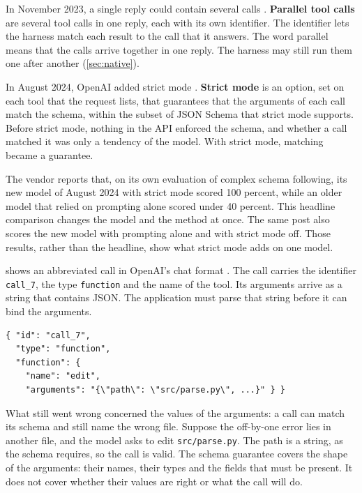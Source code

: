 In November 2023, a single reply could contain several calls \citep{openai2023devday}.
\textbf{Parallel tool calls} are several tool calls in one reply, each with its own identifier. The
identifier lets the harness match each result to the call that it answers. The word parallel means
that the calls arrive together in one reply. The harness may still run them one after another
(\cref{sec:native}).

In August 2024, OpenAI added strict mode \citep{openai2024structuredoutputs}. \textbf{Strict mode} is
an option, set on each tool that the request lists, that guarantees that the arguments of each call
match the schema, within the subset of JSON Schema that strict mode supports. Before strict mode,
nothing in the API enforced the schema, and whether a call matched it was only a tendency of the
model. With strict mode, matching became a guarantee.

The vendor reports that, on its own evaluation of complex schema following, its new model of August
2024 with strict mode scored 100 percent, while an older model that relied on prompting alone scored
under 40 percent. This headline comparison changes the model and the method at once. The same post
also scores the new model with prompting alone and with strict mode off. Those results, rather than
the headline, show what strict mode adds on one model.

 shows an abbreviated call in OpenAI's chat format
\citep{openai-function-calling}. The call carries the identifier \texttt{call\_7}, the type
\texttt{function} and the name of the tool. Its arguments arrive as a string that contains JSON.
The application must parse that string before it can bind the arguments.

\begin{lstlisting}[basicstyle=\ttfamily\footnotesize, caption={An illustrative tool call in OpenAI's chat format, abbreviated. The arguments arrive as a string.}, label=lst:toolcalls-openai]
{ "id": "call_7",
  "type": "function",
  "function": {
    "name": "edit",
    "arguments": "{\"path\": \"src/parse.py\", ...}" } }
\end{lstlisting}

What still went wrong concerned the values of the arguments: a call can match its schema and still
name the wrong file. Suppose the off-by-one error lies in another file, and the model asks to edit
\texttt{src/parse.py}. The path is a string, as the schema requires, so the call is valid. The schema
guarantee covers the shape of the arguments: their names, their types and the fields that must be
present. It does not cover whether their values are right or what the call will do.

